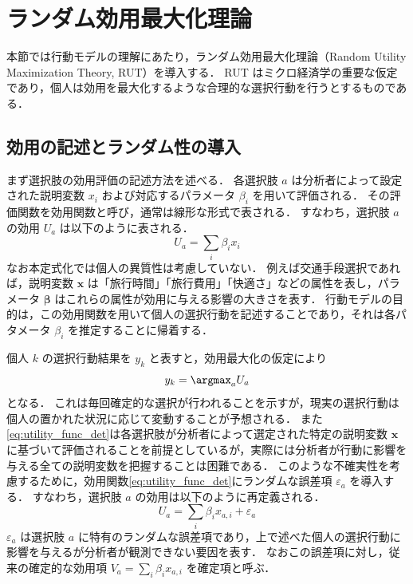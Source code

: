 
\section{ランダム効用最大化理論}\label{sec:abms}

本節では行動モデルの理解にあたり，ランダム効用最大化理論（Random Utility Maximization Theory, RUT）を導入する．
RUT はミクロ経済学の重要な仮定であり，個人は効用を最大化するような合理的な選択行動を行うとするものである．

\subsection{効用の記述とランダム性の導入}
まず選択肢の効用評価の記述方法を述べる．
各選択肢 $a$ は分析者によって設定された説明変数 $x_{i}$ および対応するパラメータ $\beta_{i}$ を用いて評価される．
その評価関数を効用関数と呼び，通常は線形な形式で表される．
すなわち，選択肢 $a$ の効用 $U_{a}$ は以下のように表される．
\begin{equation}\label{eq:utility_func_det}
U_{a} = \sum_{i} \beta_{i} x_{i}
\end{equation}
なお本定式化では個人の異質性は考慮していない．
例えば交通手段選択であれば，説明変数 $\bm{x}$ は「旅行時間」「旅行費用」「快適さ」などの属性を表し，パラメータ $\bm{\beta}$ はこれらの属性が効用に与える影響の大きさを表す．
行動モデルの目的は，この効用関数を用いて個人の選択行動を記述することであり，それは各パタメータ $\beta_{i}$ を推定することに帰着する．

個人 $k$ の選択行動結果を $y_k$ と表すと，効用最大化の仮定により
\begin{equation}\label{eq:utility_max}
y_k = \argmax_{a} U_{a}
\end{equation}
となる．
これは毎回確定的な選択が行われることを示すが，現実の選択行動は個人の置かれた状況に応じて変動することが予想される．
また\eqref{eq:utility_func_det}は各選択肢が分析者によって選定された特定の説明変数 $\bm{x}$ に基づいて評価されることを前提としているが，実際には分析者が行動に影響を与える全ての説明変数を把握することは困難である．
このような不確実性を考慮するために，効用関数\eqref{eq:utility_func_det}にランダムな誤差項 $\varepsilon_a$ を導入する．
すなわち，選択肢 $a$ の効用は以下のように再定義される．
\begin{equation}\label{eq:utility_func_random}
U_{a} = \sum_{i} \beta_{i} x_{a, i} + \varepsilon_a
\end{equation}
$\varepsilon_a$ は選択肢 $a$ に特有のランダムな誤差項であり，上で述べた個人の選択行動に影響を与えるが分析者が観測できない要因を表す．
なおこの誤差項に対し，従来の確定的な効用項 $V_a = \sum_i \beta_i x_{a, i}$ を確定項と呼ぶ．

